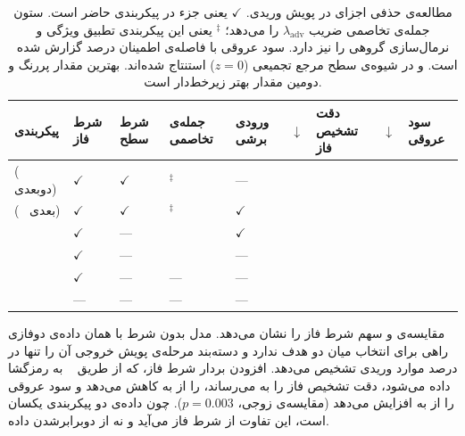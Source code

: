 \begin{table}[H]
\centering
\scriptsize
\setlength{\tabcolsep}{3pt}
\caption[مطالعه‌ی حذفی اجزای ]{مطالعه‌ی حذفی اجزای  در پویش وریدی. $\checkmark$ یعنی جزء در پیکربندی حاضر است. ستون جمله‌ی تخاصمی ضریب $\lambda_{\text{adv}}$ را می‌دهد؛ ${}^{\ddagger}$ یعنی این پیکربندی تطبیق ویژگی و نرمال‌سازی گروهی را نیز دارد. سود عروقی با فاصله‌ی اطمینان  درصد گزارش شده است.  و  در شیوه‌ی سطح مرجع تجمیعی ($z = 0$) استنتاج شده‌اند. بهترین مقدار پررنگ و دومین مقدار بهتر زیرخط‌دار است.}
\label{tab:syn-ablation}
\begin{tabular}{|R{2.5cm}|R{0.9cm}|R{0.9cm}|R{1.15cm}|R{1.1cm}|R{1.35cm}|R{1.2cm}|R{1.15cm}|R{2.05cm}|}
\hline
\textbf{پیکربندی} & \textbf{شرط فاز} & \textbf{شرط سطح} & \textbf{جمله‌ی تخاصمی} & \textbf{ورودی  برشی} & $\downarrow$ & \textbf{دقت تشخیص فاز} & $\downarrow$ & \textbf{سود عروقی} \\
\hline
{} ( دوبعدی) & $\checkmark$ & $\checkmark$ & ${}^{\ddagger}$ & --- & \underline{} & \textbf{} & \textbf{} & \textbf{} \\
\hline
{} ( ~بعدی) & $\checkmark$ & $\checkmark$ & ${}^{\ddagger}$ & $\checkmark$ &  &  &  &  \\
\hline
{} & $\checkmark$ & --- &  & $\checkmark$ &  & \textbf{} & \underline{} &  \\
\hline
{} & $\checkmark$ & --- &  & --- &  & \underline{} &  &  \\
\hline
{} & $\checkmark$ & --- & --- & --- & \textbf{} & \textbf{} &  & \underline{} \\
\hline
{} & --- & --- & --- & --- &  &  &  &  \\
\hline
\end{tabular}
\end{table}

مقایسه‌ی  و  سهم شرط فاز را نشان می‌دهد. مدل بدون شرط با همان داده‌ی دوفازی راهی برای انتخاب میان دو هدف ندارد و دسته‌بند مرحله‌ی پویش خروجی آن را تنها در  درصد موارد وریدی تشخیص می‌دهد. افزودن بردار شرط فاز، که از طریق ~\cite{perez2018film} به رمزگشا داده می‌شود، دقت تشخیص فاز را به  می‌رساند،  را از  به  کاهش می‌دهد و سود عروقی را از  به  افزایش می‌دهد (مقایسه‌ی زوجی، $p = 0.003$). چون داده‌ی دو پیکربندی یکسان است، این تفاوت از شرط فاز می‌آید و نه از دوبرابرشدن داده.

